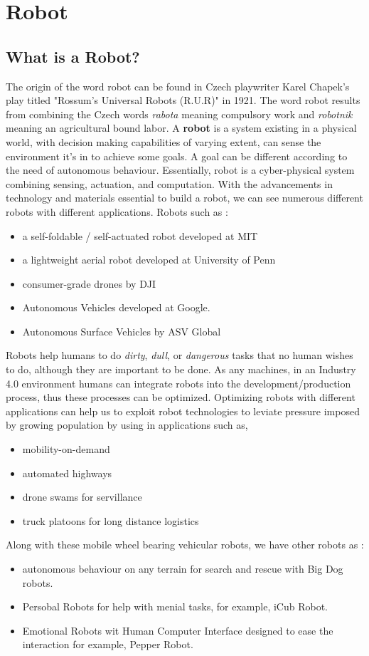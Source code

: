 \section{Robot}
\subsection{What is a Robot?}
The origin of the word robot can be found in Czech playwriter Karel Chapek's play titled "Rossum's
Universal Robots (R.U.R)" in 1921. The word robot results from combining the Czech words \textit{rabota} meaning 
compulsory work and \textit{robotnik} meaning an agricultural bound labor. A \textbf{robot} is a system existing 
in a physical world, with decision making capabilities of varying extent, can sense the environment it's in to achieve
some goals. A goal can be different according to the need of autonomous behaviour. Essentially, robot is a cyber-physical system 
combining sensing, actuation, and computation. With the advancements in technology and materials essential to build a robot, we can
see numerous different robots with different applications. Robots such as : 
\begin{itemize}
    \item a self-foldable / self-actuated robot developed at MIT \cite{Sung2016ComputationalDO}
    \item a lightweight aerial robot developed at University of Penn
    \item consumer-grade drones by DJI 
    \item Autonomous Vehicles developed at Google.
    \item Autonomous Surface Vehicles by ASV Global
\end{itemize}
Robots help humans to do \textit{dirty}, \textit{dull}, or \textit{dangerous} tasks that no human wishes to do, although they are
important to be done. As any machines, in an Industry 4.0 environment humans can integrate robots into the development/production process,
thus these processes can be optimized. Optimizing robots with different applications can help us to exploit robot technologies to leviate pressure
imposed by growing population by using in applications such as, \begin{itemize}
    \item  mobility-on-demand
    \item  automated highways
    \item  drone swams for servillance
    \item  truck platoons for long distance logistics
\end{itemize} Along with these mobile wheel bearing vehicular robots, we have other robots as : 
\begin{itemize}
    \item autonomous behaviour on any terrain for search and rescue with Big Dog robots.
    \item Persobal Robots for help with menial tasks, for example, iCub Robot.
    \item Emotional Robots wit Human Computer Interface designed to ease the interaction for example, Pepper Robot.
\end{itemize}


